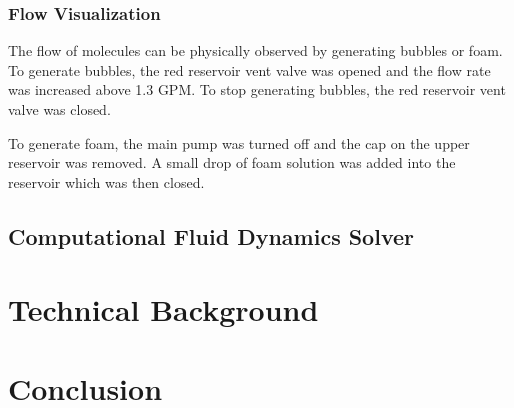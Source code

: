 \documentclass{article} %
\begin{document}
\begin{multicols}{2}
\subsubsection{Flow Visualization}

The flow of molecules can be physically observed by generating bubbles or foam.
To generate bubbles, the red reservoir vent valve was opened and the flow rate was increased above 1.3 GPM.
To stop generating bubbles, the red reservoir vent valve was closed.

To generate foam, the main pump was turned off and the cap on the upper reservoir was removed.
A small drop of foam solution was added into the reservoir which was then closed.


\subsection{Computational Fluid Dynamics Solver}


\section{Technical Background}

\section{Conclusion}

\label{last_page}

\newpage



\end{multicols}
\end{document}
